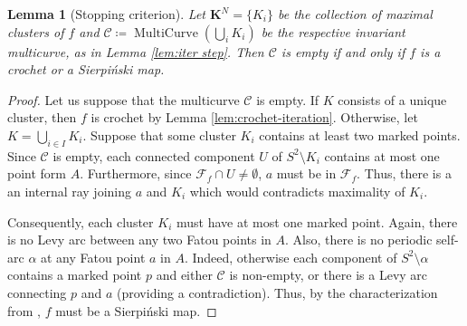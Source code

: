 \documentclass{amsart}
\theoremstyle{plain}
\newtheorem{lemma}[theorem]{Lemma}
\theoremstyle{definition}
\theoremstyle{remark}
\newcommand{\reminder}[1]{\textsl{$\lhd\rhd$#1$\lhd\rhd$}\marginpar{$\lhd\rhd\lhd\rhd\lhd\rhd$}}%
\newcommand{\hide}[1]{}
\newcommand{\CC}{{\mathcal C}}
\newcommand{\MC}{{\operatorname{MultiCurve}}}
\begin{document}
\begin{lemma}[Stopping criterion]\label{lem: trivial curve}
Let $\mathbf{K}^N=\{K_i\}$ be the collection of maximal clusters of $f$ and $\CC\coloneq \MC(\bigcup_i K_i)$ be the respective invariant multicurve, as in Lemma \ref{lem:iter step}. Then $\CC$ is empty if and only if $f$ is a crochet or a Sierpi\'{n}ski map.
\end{lemma}
\begin{proof}

Let us suppose that the multicurve $\CC$ is empty. If $K$ consists of a unique cluster, then $f$ is crochet by Lemma \ref{lem:crochet-iteration}. Otherwise, let $K=\bigcup_{i\in I} K_i$. Suppose that some cluster $K_i$ contains at least two marked points. Since $\CC$ is empty, each connected component $U$ of $S^2\setminus K_i$ contains at most one point form $A$. Furthermore, since $\mathcal{F}_f\cap U \neq \emptyset$, $a$ must be in $\mathcal{F}_f$. Thus, there is a an internal ray joining $a$ and $K_i$ which would contradicts maximality of $K_i$.

Consequently, each cluster $K_i$ must have at most one marked point. Again,  there is no Levy arc between any two Fatou points in $A$.  Also, there is no periodic self-arc $\alpha$ at any Fatou point $a$ in $A$. Indeed, otherwise each component of $S^2\setminus \alpha$ contains a marked point $p$ and either $\CC$ is non-empty, or there is a Levy arc connecting $p$ and $a$ (providing a contradiction).  Thus, by the characterization from \cite{BD_Exp}, $f$ must be a Sierpi\'{n}ski map. 







\end{proof}
\end{document}
